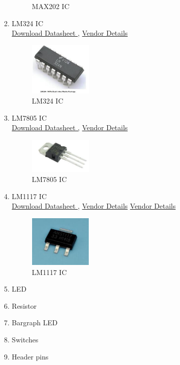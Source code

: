 \documentclass[a4paper,12pt,oneside]{book}
\begin{document}
\begin{itemize}
\begin{enumerate}
\begin{figure}[h]
	\caption{ MAX202 IC }
\end{figure}
\item LM324 IC       \\
\href{www.ti.com/lit/ds/symlink/lm124-n.pdf
} {Download Datasheet ,}
\href{http://www.dnatechindia.com/LM324.html} {Vendor Details}
\begin{figure}[!ht]
	\hspace{4cm}
	\includegraphics[width=0.3\textwidth]{lm324}
	\caption{LM324 IC }
\end{figure}
\pagebreak
\item LM7805 IC       \\
\href{https://www.sparkfun.com/datasheets/Components/LM7805.pdf
} {Download Datasheet ,}
\href{http://www.dnatechindia.com/LM7805.html} {Vendor Details}
\begin{figure}[!ht]
	\hspace{4cm}
	\includegraphics[width=0.3\textwidth]{7805}
	\caption{LM7805 IC }
\end{figure}
\item LM1117 IC       \\
\href{www.ti.com/lit/ds/symlink/lm1117.pdf
} {Download Datasheet ,}
\href{http://www.dnatechindia.com/lm-1117-1-8-v-smd-voltage-regulator.html} {Vendor Details}
\href{http://www.dnatechindia.com/LM7805.html} {Vendor Details}
\begin{figure}[!ht]
	\hspace{4cm}
	\includegraphics[width=0.3\textwidth]{1117}
	\caption{LM1117 IC }
\end{figure}
\item LED
\item Resistor
\item Bargraph LED
\item Switches
\item Header pins
\pagebreak

	
	\end{enumerate}
	\end{itemize}
	
\end{document}
